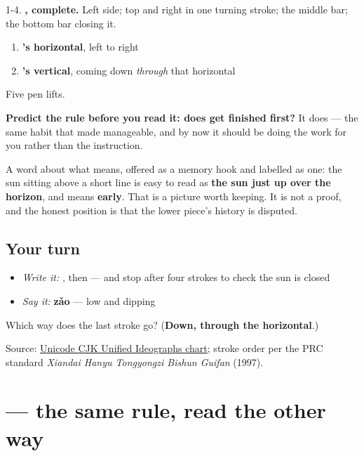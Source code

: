 1-4. \textbf{, complete.} Left side; top and right in one turning stroke; the middle bar; the bottom bar closing it.

\begin{enumerate}
\raggedright
  \item \textbf{'s horizontal}, left to right
  \item \textbf{'s vertical}, coming down \emph{through} that horizontal
\end{enumerate}

Five pen lifts.

\textbf{Predict the rule before you read it: does  get finished first?} It does — the same habit that made  manageable, and by now it should be doing the work for you rather than the instruction.

A word about what  means, offered as a memory hook and labelled as one: the sun sitting above a short line is easy to read as \textbf{the sun just up over the horizon}, and  means \textbf{early}. That is a picture worth keeping. It is not a proof, and the honest position is that the lower piece's history is disputed.

\subsection*{Your turn}
\begin{itemize}
\raggedright
  \item \emph{Write it:} , then  — and stop after four strokes to check the sun is closed
  \item \emph{Say it:} \textbf{zǎo} — low and dipping
\end{itemize}

\begin{tcolorbox}[breakable,colback=teal!4,colframe=teal!35!black,title={Before you move on}]
Which way does the last stroke go? (\textbf{Down, through the horizontal}.)

Source: \href{https://www.unicode.org/charts/PDF/U4E00.pdf}{Unicode CJK Unified Ideographs chart}; stroke order per the PRC standard \emph{Xiandai Hanyu Tongyongzi Bishun Guifan} (1997).
\end{tcolorbox}
\section[\texorpdfstring{\zh{上} (shàng)}{上 (shàng)}]{ — the same rule, read the other way}

